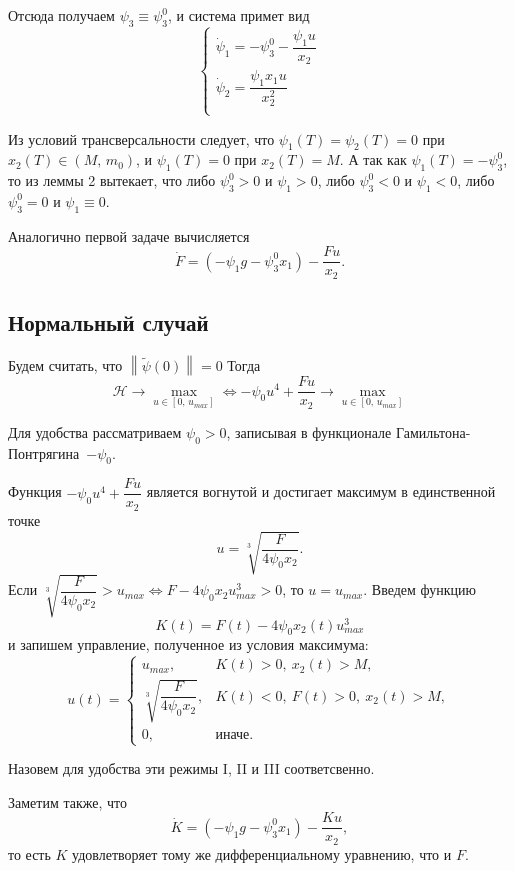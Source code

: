 \documentclass[16pt]{article}
\newcommand\Norm[1]{\left\| #1 \right\|}
\begin{document}
Отсюда получаем $\psi_3 \equiv \psi_3^0$, и система примет вид
\begin{equation}
\begin{cases} \label{2_conj_syst}
\dot{\psi}_1 = -\psi_3^0 -\dfrac{\psi_1u}{x_2}\\
\dot{\psi}_2 = \dfrac{\psi_1 x_1 u}{x_2^2} \\
\end{cases}
\end{equation}

Из условий трансверсальности следует, что $\psi_1(T) = \psi_2(T) = 0$ при $x_2(T) \in (M,\,m_0)$, и
$\psi_1(T) = 0$ при $x_2(T) = M$.
А так как $\psi_1(T) = -\psi_3^0$, то из леммы 2 вытекает, что либо $\psi_3^0 > 0$ и $\psi_1 > 0$, либо $\psi_3^0 < 0$
и $\psi_1 < 0$, либо $\psi_3^0 = 0$ и $\psi_1 \equiv 0$.

Аналогично первой задаче вычисляется
\begin{equation} \label{2_F_ode}
\dot{F} = (-\psi_1g - \psi_3^0 x_1) - \dfrac{Fu}{x_2}.
\end{equation}
\subsection{Нормальный случай}
Будем считать, что $\Norm{\tilde{\psi}(0)} = 0$ Тогда
$$\mathcal{H} \to \max_{u \in [0,\,u_{max}]} \Leftrightarrow -\psi_0u^4 + \dfrac{Fu}{x_2} \to 
\max_{u \in [0,\,u_{max}]}$$

Для удобства рассматриваем $\psi_0 > 0$, записывая в функционале Гамильтона-Понтрягина~$-\psi_0$.

Функция $-\psi_0u^4 + \dfrac{Fu}{x_2}$ является вогнутой и достигает максимум в единственной точке
$$u = \sqrt[3]{\dfrac{F}{4\psi_0x_2}}.$$
Если $\sqrt[3]{\dfrac{F}{4\psi_0x_2}} > u_{max} \Leftrightarrow F - 4\psi_0x_2u_{max}^3 > 0$, то $u = u_{max}$.
Введем функцию $$K(t) = F(t) - 4\psi_0x_2(t)u_{max}^3$$ и запишем управление, полученное из условия максимума:
 \begin{equation} \label{oc_2}
 u(t) = 
 \begin{cases}
 u_{max}, & K(t) > 0,\  x_2(t) > M, \\
 \sqrt[3]{\dfrac{F}{4\psi_0x_2}}, & K(t) < 0,\ F(t) > 0, \ x_2(t) > M, \\
 0, &\text{иначе.}
 \end{cases}
 \end{equation}

Назовем для удобства эти режимы I, II и III соответсвенно.

Заметим также, что 
$$\dot{K} = (-\psi_1g - \psi_3^0 x_1) - \dfrac{Ku}{x_2},$$
то есть $K$ удовлетворяет тому же дифференциальному уравнению, что и $F$.
\end{document}

